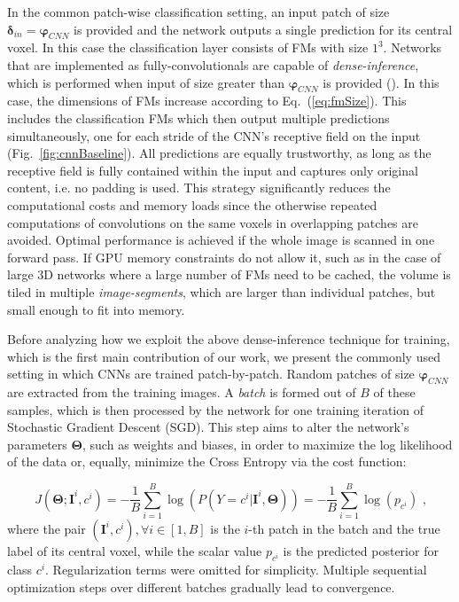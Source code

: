 \documentclass[preprint,authoryear,12pt]{elsarticle}
\newcommand{\eqcm}{\textrm{ ,}}
\begin{document}
In the common patch-wise classification setting, an input patch of size $\boldsymbol{\delta}_{in} = \boldsymbol{\varphi}_{CNN}$ is provided and the network outputs a single prediction for its central voxel. In this case the classification layer consists of FMs with size $1^3$. Networks that are implemented as fully-convolutionals are capable of \textit{dense-inference}, which is performed when input of size greater than $\boldsymbol{\varphi}_{CNN}$ is provided (\cite{Sermanet2013}). In this case, the dimensions of FMs increase according to Eq.~(\ref{eq:fmSize}). This includes the classification FMs which then output multiple predictions simultaneously, one for each stride of the CNN's receptive field on the input (Fig.~\ref{fig:cnnBaseline}). All predictions are equally trustworthy, as long as the receptive field is fully contained within the input and captures only original content, i.e. no padding is used. This strategy significantly reduces the computational costs and memory loads since the otherwise repeated computations of convolutions on the same voxels in overlapping patches are avoided. Optimal performance is achieved if the whole image is scanned in one forward pass. If GPU memory constraints do not allow it, such as in the case of large 3D networks where a large number of FMs need to be cached, the volume is tiled in multiple \textit{image-segments}, which are larger than individual patches, but small enough to fit into memory.

Before analyzing how we exploit the above dense-inference technique for training, which is the first main contribution of our work, we present the commonly used setting in which CNNs are trained patch-by-patch. Random patches of size $\boldsymbol{\varphi}_{CNN}$ are extracted from the training images. A \textit{batch} is formed out of $B$ of these samples, which is then processed by the network for one training iteration of Stochastic Gradient Descent (SGD). This step aims to alter the network's parameters $\mathbf{\Theta}$, such as weights and biases, in order to maximize the log likelihood of the data or, equally, minimize the Cross Entropy via the cost function:

\begin{equation} \label{eq:regCost}
J(\mathbf{\Theta}; \mathbf{I}^i, c^i)  = - \frac{1}{B} \sum_{i=1}^{B} \log\left(P(Y = c^i | \mathbf{I}^i, \mathbf{\Theta})\right) = - \frac{1}{B} \sum_{i=1}^{B} \log(p_{c^i}) \eqcm
\end{equation}
where the pair $(\mathbf{I}^i, c^i), \forall{i}\in{[1,B]}$ is the $i$-th patch in the batch and the true label of its central voxel, while the scalar value $p_{c^i}$ is the predicted posterior for class $c^i$. Regularization terms were omitted for simplicity. Multiple sequential optimization steps over different batches gradually lead to convergence.
\end{document}
